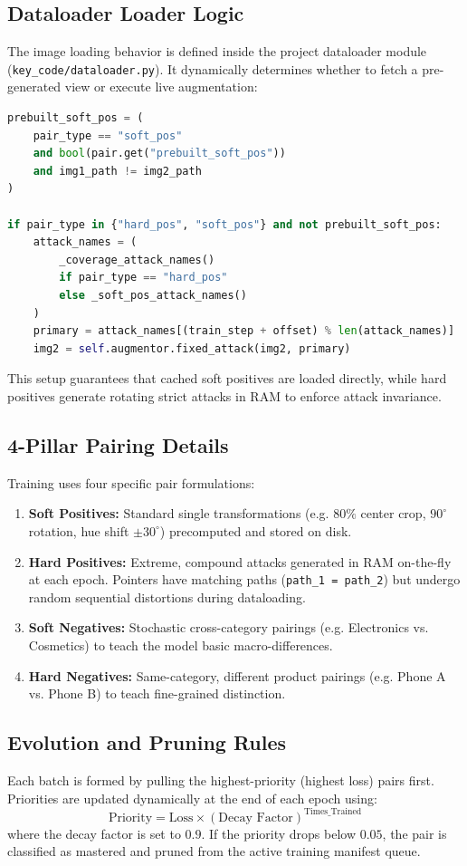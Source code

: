 \documentclass[11pt,a4paper]{article}
\begin{document}
\subsection{Dataloader Loader Logic}
The image loading behavior is defined inside the project dataloader module (\texttt{key\_code/dataloader.py}). It dynamically determines whether to fetch a pre-generated view or execute live augmentation:

\begin{lstlisting}[language=Python]
prebuilt_soft_pos = (
    pair_type == "soft_pos"
    and bool(pair.get("prebuilt_soft_pos"))
    and img1_path != img2_path
)

if pair_type in {"hard_pos", "soft_pos"} and not prebuilt_soft_pos:
    attack_names = (
        _coverage_attack_names()
        if pair_type == "hard_pos"
        else _soft_pos_attack_names()
    )
    primary = attack_names[(train_step + offset) % len(attack_names)]
    img2 = self.augmentor.fixed_attack(img2, primary)
\end{lstlisting}

This setup guarantees that cached soft positives are loaded directly, while hard positives generate rotating strict attacks in RAM to enforce attack invariance.

\subsection{4-Pillar Pairing Details}
Training uses four specific pair formulations:
\begin{enumerate}
    \item \textbf{Soft Positives:} Standard single transformations (e.g. $80\%$ center crop, $90^{\circ}$ rotation, hue shift $\pm 30^{\circ}$) precomputed and stored on disk.
    \item \textbf{Hard Positives:} Extreme, compound attacks generated in RAM on-the-fly at each epoch. Pointers have matching paths (\texttt{path\_1 = path\_2}) but undergo random sequential distortions during dataloading.
    \item \textbf{Soft Negatives:} Stochastic cross-category pairings (e.g. Electronics vs. Cosmetics) to teach the model basic macro-differences.
    \item \textbf{Hard Negatives:} Same-category, different product pairings (e.g. Phone A vs. Phone B) to teach fine-grained distinction.
\end{enumerate}

\subsection{Evolution and Pruning Rules}
Each batch is formed by pulling the highest-priority (highest loss) pairs first. Priorities are updated dynamically at the end of each epoch using:
\begin{equation}
    \text{Priority} = \text{Loss} \times (\text{Decay Factor})^{\text{Times\_Trained}}
\end{equation}
where the decay factor is set to $0.9$. If the priority drops below $0.05$, the pair is classified as mastered and pruned from the active training manifest queue. 
\end{document}
